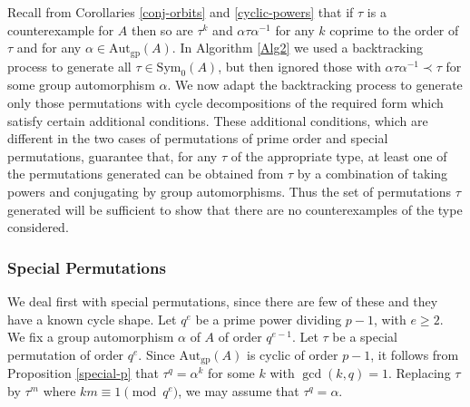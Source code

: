 \documentclass[letterpaper,12pt]{amsart}
\numberwithin{equation}{section}
\numberwithin{algorithm}{section}
\theoremstyle{definition}
\newcommand{\Autgp}{\mathrm{Aut}_{\mathrm{gp}}}
\newcommand{\Symo}{\mathrm{Sym}_0}
\begin{document}
Recall from Corollaries \ref{conj-orbits} and \ref{cyclic-powers} that if $\tau$ is a counterexample for $A$ then so are $\tau^k$ and $\alpha \tau \alpha^{-1}$ for any $k$ coprime to the order of $\tau$ and for any $\alpha \in \Autgp(A)$. In Algorithm \ref{Alg2} we used a backtracking process to generate all $\tau \in \Symo(A)$, but then ignored those with  $\alpha \tau \alpha^{-1} \prec \tau$ for some group automorphism $\alpha$. We now adapt the backtracking process to generate only those permutations with cycle decompositions of the required form which satisfy certain additional conditions. These additional conditions, which are different in the two cases of permutations of prime order and special permutations, guarantee that, for any $\tau$ of the appropriate type, at least one of the permutations generated can be obtained from $\tau$ by a combination of taking powers and conjugating by group automorphisms. Thus the set of permutations $\tau$ generated will be sufficient to show that there are no counterexamples of the type considered.

\subsubsection{Special Permutations}

We deal first with special permutations, since there are few of these and they have a known cycle shape. Let $q^e$ be a prime power dividing $p-1$, with $e \geq 2$. We fix a group automorphism $\alpha$ of $A$ of order $q^{e-1}$. Let $\tau$ be a special permutation of order $q^e$. Since $\Autgp(A)$ is cyclic of order $p-1$, it follows from Proposition \ref{special-p} that $\tau^q=\alpha^k$ for some $k$ with $\gcd(k,q)=1$. Replacing $\tau$ by $\tau^m$ where $km \equiv 1 \pmod{q^e}$, we may assume that $\tau^q=\alpha$.  
\end{document}
